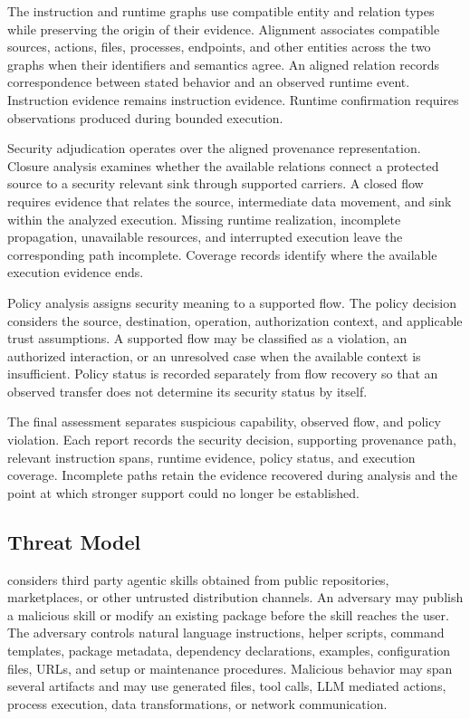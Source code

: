 The instruction and runtime graphs use compatible entity and relation types while preserving the origin of their evidence. Alignment associates compatible sources, actions, files, processes, endpoints, and other entities across the two graphs when their identifiers and semantics agree. An aligned relation records correspondence between stated behavior and an observed runtime event. Instruction evidence remains instruction evidence. Runtime confirmation requires observations produced during bounded execution.

Security adjudication operates over the aligned provenance representation. Closure analysis examines whether the available relations connect a protected source to a security relevant sink through supported carriers. A closed flow requires evidence that relates the source, intermediate data movement, and sink within the analyzed execution. Missing runtime realization, incomplete propagation, unavailable resources, and interrupted execution leave the corresponding path incomplete. Coverage records identify where the available execution evidence ends.

Policy analysis assigns security meaning to a supported flow. The policy decision considers the source, destination, operation, authorization context, and applicable trust assumptions. A supported flow may be classified as a violation, an authorized interaction, or an unresolved case when the available context is insufficient. Policy status is recorded separately from flow recovery so that an observed transfer does not determine its security status by itself.

The final assessment separates suspicious capability, observed flow, and policy violation. Each report records the security decision, supporting provenance path, relevant instruction spans, runtime evidence, policy status, and execution coverage. Incomplete paths retain the evidence recovered during analysis and the point at which stronger support could no longer be established.


\subsection{Threat Model}

\system considers third party agentic skills obtained from public repositories, marketplaces, or other untrusted distribution channels. An adversary may publish a malicious skill or modify an existing package before the skill reaches the user. The adversary controls natural language instructions, helper scripts, command templates, package metadata, dependency declarations, examples, configuration files, URLs, and setup or maintenance procedures. Malicious behavior may span several artifacts and may use generated files, tool calls, LLM mediated actions, process execution, data transformations, or network communication.

